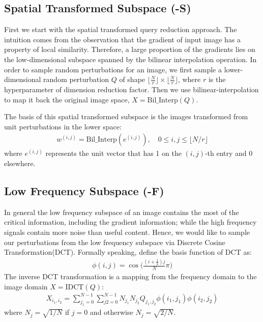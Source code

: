 \subsection{Spatial Transformed Subspace (\name-S)}
\label{sec:name-S}
First we start with the spatial transformed query reduction approach.
The intuition comes from the observation that the gradient of input image has a property of local similarity\cite{ilyas2018prior}. Therefore, a large proportion of the gradients lies on the low-dimensional subspace spanned by the bilinear interpolation operation\cite{spath1993two}.
In order to sample random perturbations for an image, we first sample a lower-dimensional random perturbation $Q$ of shape $\lfloor \frac Nr \rfloor \times \lfloor \frac Nr \rfloor$, where $r$ is the hyperparameter of dimension reduction factor. Then we use bilinear-interpolation to map it back the original image space, $X = \text{Bil\_Interp}(Q)$.

The basis of this spatial transformed subspace is the images transformed from unit perturbations in the lower space:
\begin{align*}
    w^{(i,j)} = \text{Bil\_Interp}(e^{(i,j)}),\quad 0\leq i,j \leq \lfloor N/r \rfloor
\end{align*}
where $e^{(i,j)}$ represents the unit vector that has 1 on the $(i,j)$-th entry and 0 elsewhere.

\subsection{Low Frequency Subspace (\name-F)}
\label{sec:name-F}
In general the low frequency subspace of an image contains the most of the critical information, including the gradient information\cite{guo2018low}; while the high frequency signals contain more noise than useful content.
Hence, we would like to sample our perturbations from the low frequency subspace via Discrete Cosine Transformation(DCT)\cite{ahmed1974discrete}. Formally speaking, define the basis function of DCT as:
\begin{align}
    \phi(i,j) = \cos \bigg(\frac{(i+\frac12)j}{N} \pi \bigg)
\end{align}
The inverse DCT transformation is a mapping from the frequency domain to the image domain $X=\text{IDCT}(Q)$:
\begin{align}
    X_{i_1,i_2}=\sum_{j_1=0}^{N-1}\sum_{j2=0}^{N-1} N_{j_1} N_{j_2} Q_{j_1,j_2} \phi(i_1,j_1) \phi(i_2,j_2)
\end{align}
where $N_j=\sqrt{1/N}$ if $j=0$ and otherwise $N_j=\sqrt{2/N}$.

